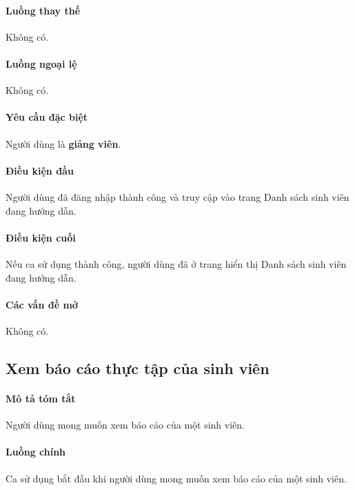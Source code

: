\documentclass[./../main.tex]{subfiles}
\begin{document}
\paragraph*{Luồng thay thế} Không có.

\paragraph*{Luồng ngoại lệ} Không có.

\paragraph*{Yêu cầu đặc biệt}

Người dùng là \textbf{giảng viên}.

\paragraph*{Điều kiện đầu}

Người dùng đã đăng nhập thành công và truy cập vào trang Danh sách sinh viên đang hướng dẫn.

\paragraph*{Điều kiện cuối}

Nếu ca sử dụng thành công, người dùng đã ở trang hiển thị Danh sách sinh viên đang hướng dẫn.

\paragraph*{Các vấn đề mở}

Không có.

\subsection{Xem báo cáo thực tập của sinh viên}

\paragraph*{Mô tả tóm tắt}

Người dùng mong muốn xem báo cáo của một sinh viên.

\paragraph*{Luồng chính} Ca sử dụng bắt đầu khi người dùng mong muốn xem báo cáo của một sinh viên.
\end{document}
